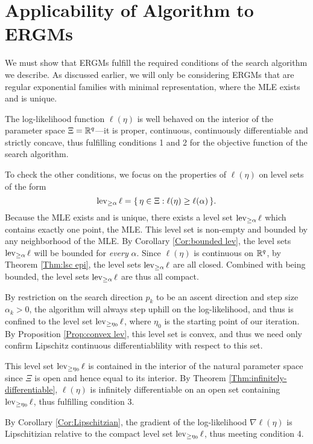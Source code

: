 \section{Applicability of Algorithm to ERGMs}
We must show that ERGMs fulfill the required conditions of the search algorithm we describe.  As discussed earlier, we will only be considering ERGMs that are regular exponential families with minimal representation, where the MLE exists and is unique.  

The log-likelihood function $\ell(\eta)$ is well behaved on the interior of the parameter space $\Xi = {\mathbb R}^q$---it is proper, continuous, continuously differentiable and strictly concave, thus fulfilling conditions 1 and 2 for the objective function of the search algorithm.  

To check the other conditions, we focus on the properties of $\ell(\eta)$ on level sets of the form
$$
   \operatorname{lev}_{\geq \alpha} \ell = \{\, \eta \in \Xi : \ell(\eta) \geq \ell(\alpha) \,\}.
$$
Because the MLE exists and is unique, there exists a level set $\operatorname{lev}_{\geq \alpha} \ell$ which contains exactly one point, the MLE.  This level set is non-empty and bounded by any neighborhood of the MLE.  By Corollary \ref{Cor:bounded lev}, the level sets $\operatorname{lev}_{\geq \alpha} \ell$ will be bounded for \emph{every} $\alpha$.  Since $\ell(\eta)$ is continuous on ${\mathbb R}^q$, by Theorem \ref{Thm:lsc epi}, the level sets $\operatorname{lev}_{\geq \alpha} \ell$ are all closed.  Combined with being bounded, the level sets $\operatorname{lev}_{\geq \alpha} \ell$ are thus all compact.  

By restriction on the search direction $p_k$ to be an ascent direction and step size $\alpha_k > 0$, the algorithm will always step uphill on the log-likelihood, and thus is confined to the level set $\operatorname{lev}_{\geq \eta_0} \ell$, where $\eta_0$ is the starting point of our iteration.  By Proposition \ref{Prop:convex lev}, this level set is convex, and thus we need only confirm Lipschitz continuous differentiablility with respect to this set.

This level set $\operatorname{lev}_{\geq \eta_0} \ell$ is contained in the interior of the natural parameter space since $\Xi$ is open and hence equal to its interior.  By Theorem \ref{Thm:infinitely-differentiable}, $\ell(\eta)$ is infinitely differentiable on an open set containing $\operatorname{lev}_{\geq \eta_0} \ell$, thus fulfilling condition 3.

By Corollary \ref{Cor:Lipschitzian}, the gradient of the log-likelihood $\nabla \ell(\eta)$ is Lipschitizian relative to the compact level set $\operatorname{lev}_{\geq \eta_0} \ell$, thus meeting condition 4.

